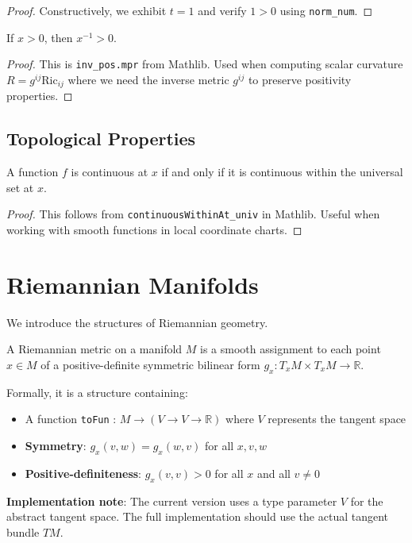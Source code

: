 \begin{proof}
\leanok
Constructively, we exhibit $t = 1$ and verify $1 > 0$ using \texttt{norm\_num}.
\end{proof}

\begin{lemma}
\label{lem:inv_pos_of_pos}
\leanok
If $x > 0$, then $x^{-1} > 0$.
\end{lemma}

\begin{proof}
\leanok
This is \texttt{inv\_pos.mpr} from Mathlib.
Used when computing scalar curvature $R = g^{ij} \mathrm{Ric}_{ij}$ where
we need the inverse metric $g^{ij}$ to preserve positivity properties.
\end{proof}

\section{Topological Properties}

\begin{lemma}
\label{lem:continuous_at_iff}
\leanok
A function $f$ is continuous at $x$ if and only if it is continuous within
the universal set at $x$.
\end{lemma}

\begin{proof}
\leanok
This follows from \texttt{continuousWithinAt\_univ} in Mathlib.
Useful when working with smooth functions in local coordinate charts.
\end{proof}

\chapter{Riemannian Manifolds}
\label{chap:riemannian}

We introduce the structures of Riemannian geometry.

\begin{definition}
\label{def:riemannian_metric}
\leanok
{}
A Riemannian metric on a manifold $M$ is a smooth assignment to each point $x \in M$
of a positive-definite symmetric bilinear form $g_x : T_xM \times T_xM \to \mathbb{R}$.

Formally, it is a structure containing:
\begin{itemize}
\item A function \texttt{toFun} : $M \to (V \to V \to \mathbb{R})$ where $V$ represents the tangent space
\item \textbf{Symmetry}: $g_x(v, w) = g_x(w, v)$ for all $x, v, w$
\item \textbf{Positive-definiteness}: $g_x(v, v) > 0$ for all $x$ and all $v \neq 0$
\end{itemize}

\textbf{Implementation note}: The current version uses a type parameter $V$ for the abstract
tangent space. The full implementation should use the actual tangent bundle $TM$.
\end{definition}

